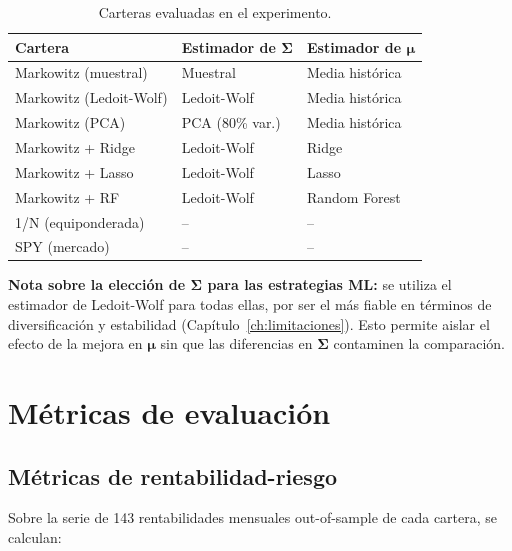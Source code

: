 \begin{table}[htbp]
    \centering
    \caption{Carteras evaluadas en el experimento.}
    \label{tab:carteras-evaluadas}
    \begin{tabular}{lll}
        \toprule
        \textbf{Cartera} & \textbf{Estimador de $\boldsymbol{\Sigma}$} & \textbf{Estimador de $\boldsymbol{\mu}$} \\
        \midrule
        Markowitz (muestral) & Muestral & Media histórica \\
        Markowitz (Ledoit-Wolf) & Ledoit-Wolf & Media histórica \\
        Markowitz (PCA) & PCA (80\% var.) & Media histórica \\
        Markowitz + Ridge & Ledoit-Wolf & Ridge \\
        Markowitz + Lasso & Ledoit-Wolf & Lasso \\
        Markowitz + RF & Ledoit-Wolf & Random Forest \\
        1/N (equiponderada) & -- & -- \\
        SPY (mercado) & -- & -- \\
        \bottomrule
    \end{tabular}
\end{table}

\textbf{Nota sobre la elección de $\boldsymbol{\Sigma}$ para las estrategias
ML:} se utiliza el estimador de Ledoit-Wolf para todas ellas, por ser el más
fiable en términos de diversificación y estabilidad
(Capítulo~\ref{ch:limitaciones}). Esto permite aislar el efecto de la mejora
en $\boldsymbol{\mu}$ sin que las diferencias en $\boldsymbol{\Sigma}$
contaminen la comparación.

\section{Métricas de evaluación}

\subsection{Métricas de rentabilidad-riesgo}

Sobre la serie de 143 rentabilidades mensuales out-of-sample de cada
cartera, se calculan:

